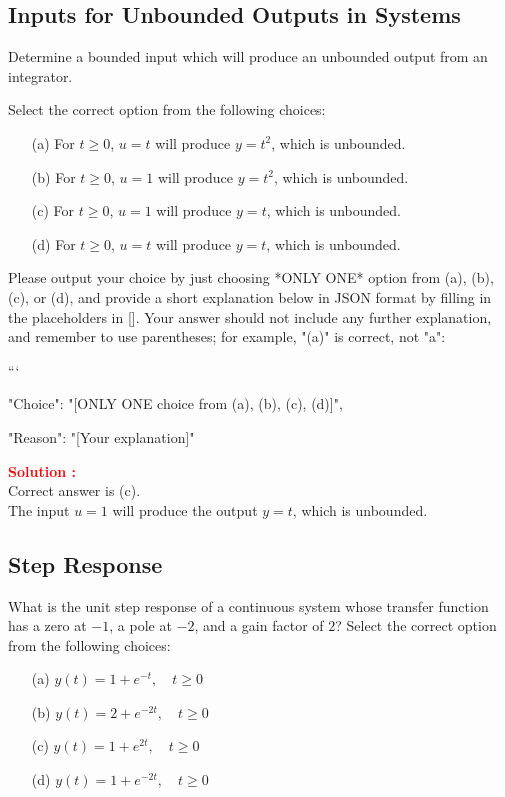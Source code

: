 \documentclass[12pt]{article}
\begin{document}
\subsection{Inputs for Unbounded Outputs in Systems}

Determine a bounded input which will produce an unbounded output from an integrator.

Select the correct option from the following choices:
\begin{enumerate}
    \item [(a)]  For \(t \geq 0 \), \(u = t\) will produce \(y=t^2\), which is unbounded.
    \item [(b)]  For \(t \geq 0 \),  \(u = 1\) will produce \(y=t^2\), which is unbounded.
    \item [(c)]  For \(t \geq 0 \),  \(u = 1\) will produce \(y=t\), which is unbounded.
    \item [(d)]  For \(t \geq 0 \),  \(u = t\) will produce \(y=t\), which is unbounded.
\end{enumerate}

Please output your choice by just choosing *ONLY ONE* option from (a), (b), (c), or (d), and provide a short explanation below in JSON format by filling in the placeholders in []. Your answer should not include any further explanation, and remember to use parentheses; for example, "(a)" is correct, not "a": 

```
{

"Choice": "[ONLY ONE choice from (a), (b), (c), (d)]",

"Reason": "[Your explanation]"

}


\textbf{\textcolor{red}{Solution :}} \\
Correct answer is (c).\\
The input \(u = 1\) will produce the output \(y=t\), which is unbounded. 
\clearpage

\subsection{Step Response}

What is the unit step response of a continuous system whose transfer function has a zero at \(-1\), a pole at \(-2\), and a gain factor of \(2\)?
Select the correct option from the following choices:
\begin{enumerate}
    \item [(a)] \(y(t) = 1 + e^{-t}, \quad t \geq 0 \)
    \item [(b)] \(y(t) = 2 + e^{-2t}, \quad t \geq 0 \)
    \item [(c)] \(y(t) = 1 + e^{2t}, \quad t \geq 0 \)
    \item [(d)] \(y(t) = 1 + e^{-2t}, \quad t \geq 0 \)
\end{enumerate}
\end{document}
